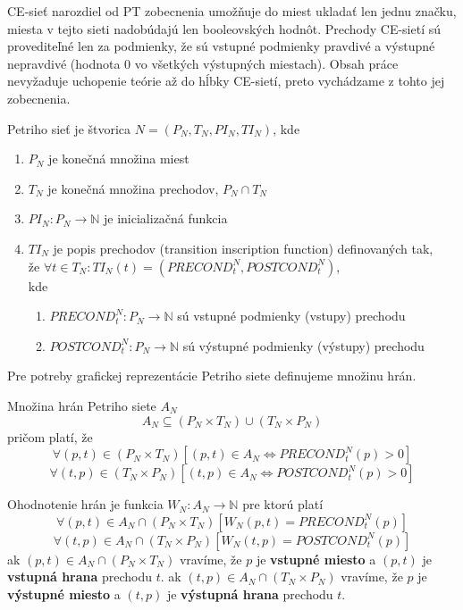 \begin{note}
	CE-sieť narozdiel od PT zobecnenia umožňuje do miest ukladať len jednu značku, miesta v tejto sieti nadobúdajú len booleovských hodnôt. Prechody CE-sietí sú provediteľné len za podmienky, že sú vstupné podmienky pravdivé a výstupné nepravdivé (hodnota 0 vo všetkých výstupných miestach). Obsah práce nevyžaduje uchopenie teórie až do hĺbky CE-sietí, preto vychádzame z tohto jej zobecnenia. 
\end{note}

\begin{defn} Petriho sieť je štvorica $N = (P_N, T_N, PI_N, TI_N)$, kde \begin{enumerate}
	\item $P_N$ je konečná množina miest
	\item $T_N$ je konečná množina prechodov, $P_N \cap T_N$
	\item $PI_N : P_N \longrightarrow  \mathbb{N}$ je inicializačná funkcia
	\item $TI_N$ je popis prechodov (transition inscription function) definovaných tak,\\
	\quad že $\forall t \in T_N : TI_N(t) = (PRECOND_t^N, POSTCOND_t^N)$,\\
	kde
	\begin{enumerate}
		\item $PRECOND_t^N : P_N \longrightarrow \mathbb{N}$ sú vstupné podmienky (vstupy) prechodu
		\item $POSTCOND_t^N : P_N \longrightarrow \mathbb{N}$ sú výstupné podmienky (výstupy) prechodu
	\end{enumerate}
\end{enumerate} \end{defn}

Pre potreby grafickej reprezentácie Petriho siete definujeme množinu hrán.

\begin{defn}
	Množina hrán Petriho siete $A_N$
	$$ A_N \subseteq (P_N \times T_N) \cup (T_N \times P_N)$$
	pričom platí, že
	$$ \forall (p,t) \in (P_N \times T_N) [(p,t) \in A_N \Longleftrightarrow PRECOND_t^N(p) > 0 ]$$
	$$ \forall (t,p) \in (T_N \times P_N) [(t,p) \in A_N \Longleftrightarrow POSTCOND_t^N(p) > 0 ]$$
\end{defn}

\begin{defn}
	Ohodnotenie hrán je funkcia $W_N : A_N \longrightarrow \mathbb{N}$ pre ktorú platí
	$$ \forall (p,t) \in A_N \cap (P_N \times T_N) [W_N(p,t) = PRECOND_t^N(p) ]$$
	$$ \forall (t,p) \in A_N \cap (T_N \times P_N) [W_N(t,p) =  POSTCOND_t^N(p)]$$
	ak $(p,t) \in A_N \cap (P_N \times T_N)$ vravíme, že $p$ je \textbf{vstupné miesto} a $(p,t)$ je \textbf{vstupná hrana} prechodu $t$. ak $(t,p) \in A_N \cap (T_N \times P_N)$ vravíme, že $p$ je \textbf{výstupné miesto} a $(t,p)$ je \textbf{výstupná hrana} prechodu $t$.
\end{defn}

